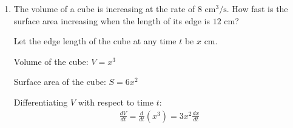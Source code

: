 \begin{enumerate}[label=\thesubsection.\arabic*, ref=\thesubsection.\theenumi]
Using the quotient rule on the left-hand side and standard logarithmic differentiation on the right-hand side:
\begin{align*}
	\frac{x\frac{dy}{dx} - y(1)}{x^2} &= \frac{1}{x} - \frac{b}{a+bx} \\
	\frac{x\frac{dy}{dx} - y}{x^2} &= \frac{(a+bx) - bx}{x(a+bx)} \\
	\frac{x\frac{dy}{dx} - y}{x^2} &= \frac{a}{x(a+bx)}
\end{align*}

Multiplying both sides by $x^2$:
\begin{align}
	x\frac{dy}{dx} - y = \frac{ax}{a+bx} \label{eq:first_order_rel}
\end{align}

Differentiating both sides of equation \eqref{eq:first_order_rel} with respect to $x$:
\begin{align*}
	\frac{d}{dx}\left(x\frac{dy}{dx} - y\right) &= \frac{d}{dx}\left(\frac{ax}{a+bx}\right) \\
	\left(1 \cdot \frac{dy}{dx} + x\frac{d^2y}{dx^2}\right) - \frac{dy}{dx} &= \frac{(a+bx)\frac{d}{dx}(ax) - (ax)\frac{d}{dx}(a+bx)}{(a+bx)^2} \\
	x\frac{d^2y}{dx^2} &= \frac{a^2 + abx - abx}{(a+bx)^2} \\
	x\frac{d^2y}{dx^2} &= \frac{a^2}{(a+bx)^2}\\
	x^3\frac{d^2y}{dx^2} &= \frac{a^2 x^2}{(a+bx)^2} \\
	x^3\frac{d^2y}{dx^2} &= \left(\frac{ax}{a+bx}\right)^2
\end{align*}

Substituting $\dfrac{ax}{a+bx} = x\dfrac{dy}{dx} - y$ from equation \eqref{eq:first_order_rel}:
\begin{align*}
	x^3\frac{d^2y}{dx^2} = \left(x\frac{dy}{dx} - y\right)^2
\end{align*}

\item The volume of a cube is increasing at the rate of $8\text{ cm}^3/\text{s}$. How fast is the surface area increasing when the length of its edge is $12$ cm?

\solution
Let the edge length of the cube at any time $t$ be $x$ cm.

Volume of the cube: $V = x^3$


Surface area of the cube: $S = 6x^2$

Differentiating $V$ with respect to time $t$:
\begin{align*}
	\frac{dV}{dt} = \frac{d}{dt}(x^3) = 3x^2 \frac{dx}{dt}
\end{align*}


\end{enumerate}
